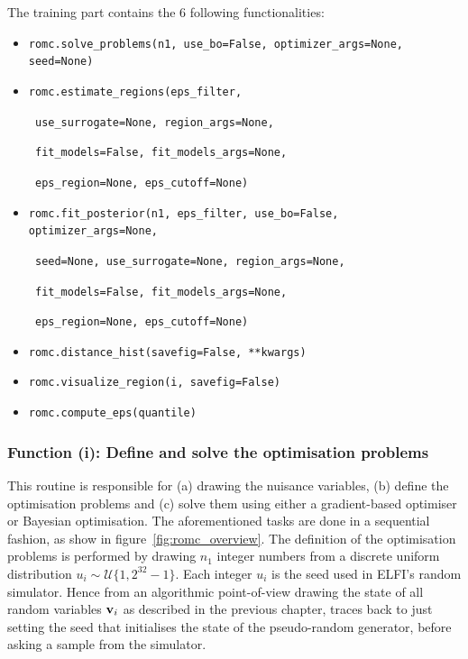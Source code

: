 The training part contains the 6 following functionalities:

\begin{itemize}
\item \texttt{romc.solve_problems(n1, use_bo=False, optimizer_args=None, seed=None)}
\item \texttt{romc.estimate_regions(eps_filter,}
  
      \texttt{                      use_surrogate=None, region_args=None,}
  
      \texttt{                      fit_models=False, fit_models_args=None,}
  
      \texttt{                      eps_region=None, eps_cutoff=None)}
      
    \item \texttt{romc.fit_posterior(n1, eps_filter, use_bo=False, optimizer_args=None,}
  
          \texttt{                   seed=None, use_surrogate=None, region_args=None,}
  
          \texttt{                   fit_models=False, fit_models_args=None,}
  
          \texttt{                   eps_region=None, eps_cutoff=None)}

\item \texttt{romc.distance_hist(savefig=False, **kwargs)}
\item \texttt{romc.visualize_region(i, savefig=False)}
\item \texttt{romc.compute_eps(quantile)}
\end{itemize}


\subsubsection*{Function (i): Define and solve the optimisation problems}

\vspace{5mm}

\noindent
This routine is responsible for (a) drawing the nuisance variables,
(b) define the optimisation problems and (c) solve them using either a
gradient-based optimiser or Bayesian optimisation. The aforementioned
tasks are done in a sequential fashion, as show in
figure~\ref{fig:romc_overview}. The definition of the optimisation
problems is performed by drawing $n_1$ integer numbers from a discrete
uniform distribution $u_i \sim \mathcal{U}\{1, 2^{32}-1\}$. Each
integer $u_i$ is the seed used in ELFI's random simulator. Hence from
an algorithmic point-of-view drawing the state of all random
variables $\mathbf{v}_i$ as described in the previous chapter, traces back to
just setting the seed that initialises the state of the pseudo-random
generator, before asking a sample from the simulator.

